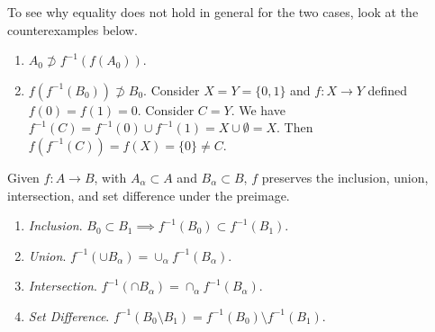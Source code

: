   \begin{example}
    To see why equality does not hold in general for the two cases, look at the counterexamples below. 
    \begin{enumerate}
      \item $A_0 \not\supset f^{-1} (f(A_0))$. 
      \item $f(f^{-1}(B_0)) \not\supset B_0$. Consider $X = Y = \{0, 1\}$ and $f: X \rightarrow Y$ defined $f(0) = f(1) = 0$. Consider $C = Y$. We have $f^{-1} (C) = f^{-1} (0) \cup f^{-1} (1) = X \cup \emptyset = X$. Then $f(f^{-1} (C)) = f(X) = \{0\} \neq C$. 
    \end{enumerate}
  \end{example}

  \begin{theorem}
    Given $f: A \rightarrow B$, with $A_\alpha \subset A$ and $B_\alpha \subset B$, $f$ preserves the inclusion, union, intersection, and set difference under the preimage. 
    \begin{enumerate}
      \item \textit{Inclusion}. $B_0 \subset B_1 \implies f^{-1} (B_0) \subset f^{-1} (B_1)$. 
      \item \textit{Union}. $f^{-1} (\cup B_\alpha) = \cup_\alpha f^{-1} (B_\alpha)$. 
      \item \textit{Intersection}. $f^{-1} (\cap B_\alpha) = \cap_\alpha f^{-1} (B_\alpha)$.
      \item \textit{Set Difference}. $f^{-1}(B_0 \setminus B_1) = f^{-1} (B_0) \setminus f^{-1} (B_1)$. 
    \end{enumerate}
  \end{theorem} 
